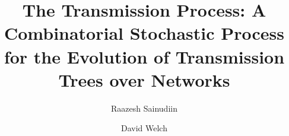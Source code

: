\documentclass[review]{elsarticle}
\numberwithin{equation}{section}
\begin{document}
\begin{frontmatter}

\title{The Transmission Process: A Combinatorial Stochastic Process for the Evolution of Transmission Trees over Networks}


\author[mymainaddress,mycurrentaddress]{Raazesh Sainudiin}
\address[mymainaddress]{Laboratory for Mathematical Statistical Experiments, Christchurch Centre and\\Biomathematics Research Centre, School of Mathematics and Statistics, University of Canterbury, Private Bag 4800, Christchurch 8041, New Zealand}
\address[mycurrentaddress]{Current address: Department of Mathematics, Stockholm University, SE - 106 91 Stockholm, Sweden.}

\author[DWmainaddress]{David Welch}
\address[DWmainaddress]{Computational Evolution Group and Department of Computer Science,
University of Auckland,
Private Bag 92019,
Auckland 1142, New Zealand}



\end{frontmatter}
\end{document}
